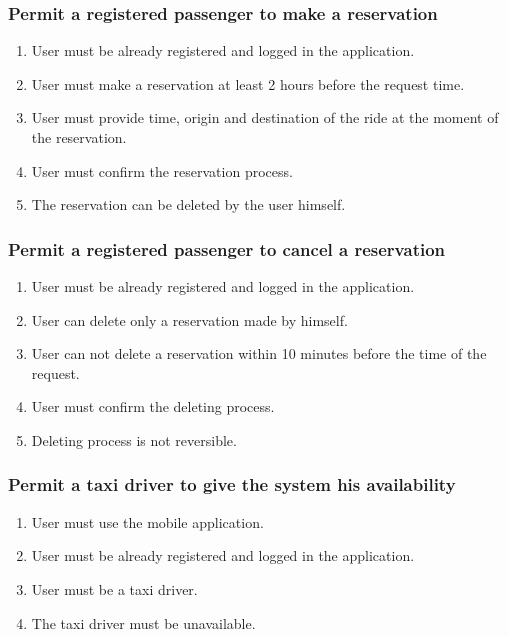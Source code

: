 		\subsubsection{Permit a registered passenger to make a reservation}
			\begin{enumerate}[label=\bfseries R\arabic*:]
				\item User must be already registered and logged in the application.
				\item User must make a reservation at least 2 hours before the request time.
				\item User must provide time, origin and destination of the ride at the moment of the reservation.
				\item User must confirm the reservation process.
				\item The reservation can be deleted by the user himself.
			\end{enumerate}
		\subsubsection{Permit a registered passenger to cancel a reservation}
			\begin{enumerate}[label=\bfseries R\arabic*:]
				\item User must be already registered and logged in the application.
				\item User can delete only a reservation made by himself.
				\item User can not delete a reservation within 10 minutes before the time of the request.
				\item User must confirm the deleting process.
				\item Deleting process is not reversible.
			\end{enumerate}
		\subsubsection{Permit a taxi driver to give the system his availability}
			\begin{enumerate}[label=\bfseries R\arabic*:]
				\item User must use the mobile application.
				\item User must be already registered and logged in the application.
				\item User must be a taxi driver.
				\item The taxi driver must be unavailable.
			\end{enumerate}
